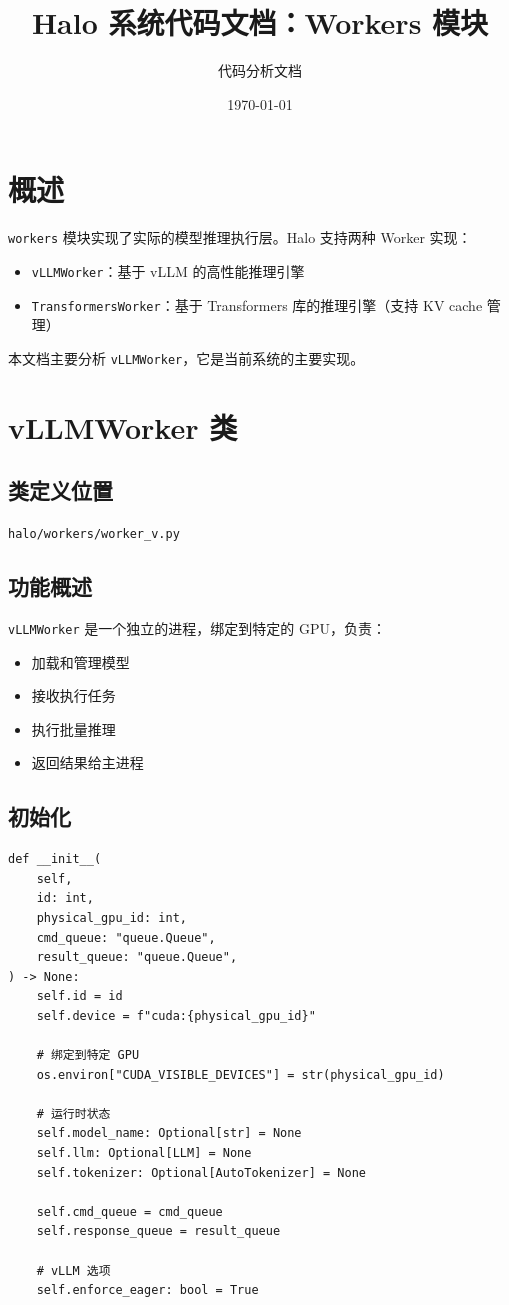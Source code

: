 \documentclass[12pt,a4paper]{article}
\title{Halo 系统代码文档：Workers 模块}
\author{代码分析文档}
\date{\today}
\begin{document}
\maketitle

\tableofcontents
\newpage

\section{概述}

\texttt{workers} 模块实现了实际的模型推理执行层。Halo 支持两种 Worker 实现：
\begin{itemize}
    \item \texttt{vLLMWorker}：基于 vLLM 的高性能推理引擎
    \item \texttt{TransformersWorker}：基于 Transformers 库的推理引擎（支持 KV cache 管理）
\end{itemize}

本文档主要分析 \texttt{vLLMWorker}，它是当前系统的主要实现。

\section{vLLMWorker 类}

\subsection{类定义位置}
\texttt{halo/workers/worker\_v.py}

\subsection{功能概述}

\texttt{vLLMWorker} 是一个独立的进程，绑定到特定的 GPU，负责：
\begin{itemize}
    \item 加载和管理模型
    \item 接收执行任务
    \item 执行批量推理
    \item 返回结果给主进程
\end{itemize}

\subsection{初始化}

\begin{lstlisting}
def __init__(
    self,
    id: int,
    physical_gpu_id: int,
    cmd_queue: "queue.Queue",
    result_queue: "queue.Queue",
) -> None:
    self.id = id
    self.device = f"cuda:{physical_gpu_id}"
    
    # 绑定到特定 GPU
    os.environ["CUDA_VISIBLE_DEVICES"] = str(physical_gpu_id)
    
    # 运行时状态
    self.model_name: Optional[str] = None
    self.llm: Optional[LLM] = None
    self.tokenizer: Optional[AutoTokenizer] = None
    
    self.cmd_queue = cmd_queue
    self.response_queue = result_queue
    
    # vLLM 选项
    self.enforce_eager: bool = True
\end{lstlisting}
\end{document}
